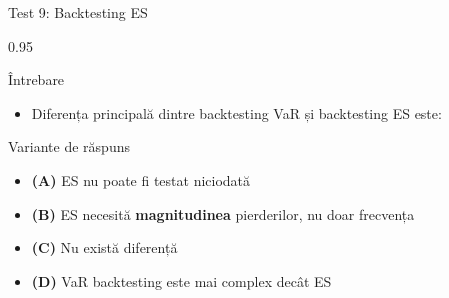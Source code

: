 \documentclass[9pt, aspectratio=169, t]{beamer}
\begin{document}
\begin{frame}{Test 9: Backtesting ES}
    \begin{cminipage}{0.95\textwidth}
    \begin{alertblock}{Întrebare}
        \begin{itemize}\setlength{\itemsep}{0pt}
            \item Diferența principală dintre backtesting VaR și backtesting ES este:
        \end{itemize}
    \end{alertblock}

    \begin{block}{Variante de răspuns}
    \begin{itemize}\setlength{\itemsep}{0pt}
        \item \textcolor{MainBlue}{\textbf{(A)}} ES nu poate fi testat niciodată
        \item \textcolor{MainBlue}{\textbf{(B)}} ES necesită \textbf{magnitudinea} pierderilor, nu doar frecvența
        \item \textcolor{MainBlue}{\textbf{(C)}} Nu există diferență
        \item \textcolor{MainBlue}{\textbf{(D)}} VaR backtesting este mai complex decât ES
    \end{itemize}
    \end{block}
    \end{cminipage}
\end{frame}
\end{document}
